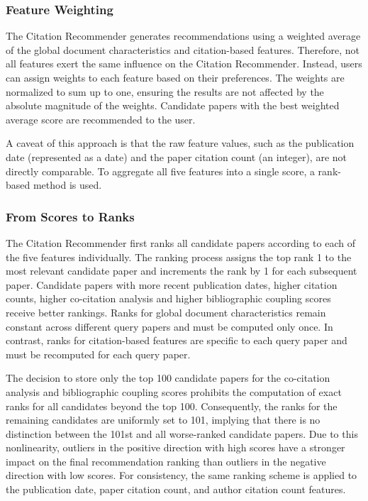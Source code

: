 \subsubsection*{Feature Weighting}

The Citation Recommender generates recommendations using a weighted average of the global document characteristics and citation-based features.
Therefore, not all features exert the same influence on the Citation Recommender. Instead, users can assign weights to each feature based on their preferences.
The weights are normalized to sum up to one, ensuring the results are not affected by the absolute magnitude of the weights.
Candidate papers with the best weighted average score are recommended to the user.

A caveat of this approach is that the raw feature values, such as the publication date (represented as a date) and the paper citation count (an integer), are not directly comparable.
To aggregate all five features into a single score, a rank-based method is used.


\subsubsection*{From Scores to Ranks}

The Citation Recommender first ranks all candidate papers according to each of the five features individually.
The ranking process assigns the top rank 1 to the most relevant candidate paper and increments the rank by 1 for each subsequent paper.
Candidate papers with more recent publication dates, higher citation counts, higher co-citation analysis and higher bibliographic coupling scores receive better rankings.
Ranks for global document characteristics remain constant across different query papers and must be computed only once.
In contrast, ranks for citation-based features are specific to each query paper and must be recomputed for each query paper.

The decision to store only the top 100 candidate papers for the co-citation analysis and bibliographic coupling scores prohibits the computation of exact ranks for all candidates beyond the top 100. Consequently, the ranks for the remaining candidates are uniformly set to 101, implying that there is no distinction between the 101st and all worse-ranked candidate papers.
Due to this nonlinearity, outliers in the positive direction with high scores have a stronger impact on the final recommendation ranking than outliers in the negative direction with low scores.
For consistency, the same ranking scheme is applied to the publication date, paper citation count, and author citation count features.


